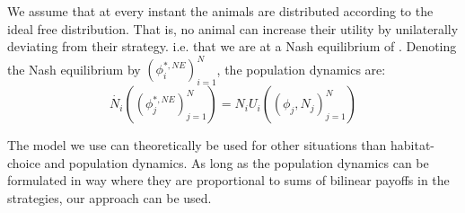 We assume that at every instant the animals are distributed according to the ideal free distribution. That is, no animal can increase their utility by unilaterally deviating from their strategy. i.e. that we are at a Nash equilibrium of . Denoting the Nash equilibrium by $(\phi_i^{*,NE})^N_{i=1}$, the population dynamics are:
\begin{equation}
  \dot{N_i}((\phi_j^{*,NE})_{j=1}^N ) = N_i U_i((\phi_j, N_j)_{j=1}^N)
\end{equation}

The model we use can theoretically be used for other situations than habitat-choice and population dynamics. As long as the population dynamics can be formulated in way where they are proportional to sums of bilinear payoffs in the strategies, our approach can be used.
%










